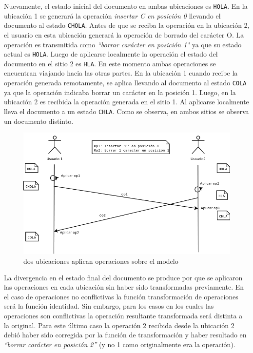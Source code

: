 \documentclass[12pt,a4paper]{article}
\begin{document}
	Nuevamente, el estado inicial del documento en ambas ubicaciones es \texttt{HOLA}. En la ubicación 1
	se generará la operación \textit{insertar C en posición 0} llevando el documento al estado \texttt{CHOLA}.
	Antes de que se reciba la operación en la ubicación 2, el usuario en esta ubicación generará la operación
	de borrado del carácter O. La operación es transmitida como \textit{``borrar carácter en posición 1"} ya que
	su estado actual es \texttt{HOLA}. Luego de aplicarse localmente la operación el estado del documento en
	el sitio 2 es \texttt{HLA}.
	En este momento ambas operaciones se encuentran viajando hacia las otras partes. En la ubicación 1 cuando recibe
	la operación generada remotamente, se aplica llevando al documento al estado \texttt{COLA} ya que la
	operación indicaba borrar un carácter en la posición 1. Luego, en la ubicación 2 es recibida la operación
	generada en el sitio 1. Al aplicarse localmente lleva el documento a un estado \texttt{CHLA}.
	Como se observa, en ambos sitios se observa un documento distinto.

	\begin{figure}[!ht]
		\begin{center}
			\includegraphics[width=14cm]{sincronizacion_fallida.png}
			\caption{\label{secuencia_ops_2} dos ubicaciones aplican operaciones sobre el modelo }
		\end{center}
	\end{figure}

	La divergencia en el estado final del documento se produce por que se aplicaron las operaciones en cada 
	ubicación sin haber sido transformadas previamente. En el caso de operaciones no conflictivas la función
	transformación de operaciones será la función  identidad. Sin embargo, para los casos en los cuales las
	operaciones son conflictivas la operación resultante transformada será distinta a la original.
	Para este último caso la operación 2 recibida desde la ubicación 2 debió haber sido corregida por la función
	de transformación y haber resultado en \textit{“borrar carácter en posición 2”} (y no 1 como originalmente
	era la operación).
	
\end{document}

